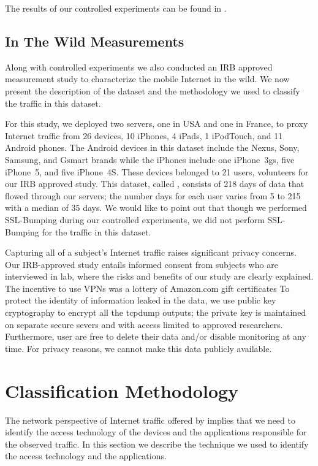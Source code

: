 The results of our controlled experiments can be found in .

\subsection{In The Wild Measurements}

Along with controlled experiments we also conducted an IRB approved measurement study to characterize the mobile Internet in the wild.
We now present the description of the dataset and the methodology we used to classify the traffic in this dataset.

For this study, we deployed two \platname servers, one in USA and one in France, to proxy Internet traffic from 26 devices, 10 iPhones, 4 iPads, 1 iPodTouch, and 11 Android phones.
The Android devices in this dataset include the Nexus, Sony, Samsung, and Gsmart brands while the iPhones include one iPhone~3gs, five iPhone~5, and five iPhone~4S.
These devices belonged to 21 users, volunteers for our IRB approved study.
This dataset, called \mobWild, consists of 218 days of data that flowed through our \platname servers; the number days for each user varies from 5 to 215 with a median of 35 days.
We would like to point out that though we performed SSL-Bumping during our controlled experiments, we did not perform SSL-Bumping for the traffic in this dataset.

Capturing all of a subject's Internet traffic raises significant privacy concerns. 
Our IRB-approved study entails informed consent from subjects who are interviewed in lab, where the risks and benefits of our study are clearly explained. 
The incentive to use VPNs was a lottery of Amazon.com gift certificates
To protect the identity of information leaked in the data, we use public key cryptography to encrypt all the tcpdump outputs; the private key is maintained on separate secure severs and with access limited to approved researchers. 
Furthermore, user are free to delete their data and/or disable monitoring at any time. 
For privacy reasons, we cannot make this data publicly available.

\section{Classification Methodology}
\label{sec:classification-methodology}

The network perspective of Internet traffic offered by \platname implies that we need to identify the access technology of the devices and the applications responsible for the observed traffic. 
In this section we describe the technique we used to identify the access technology and the applications. 

